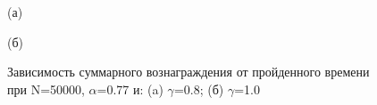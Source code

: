 \documentclass[a4paper]{report}
\theoremstyle{definition}
\theoremstyle{plain}
\theoremstyle{remark}
\theoremstyle{remark}
\theoremstyle{definition}
\begin{document}
\begin{figure}[H]
    \begin{minipage}[H]{0.49\linewidth}
        (а)\\
    \end{minipage}
    \hfill
    \begin{minipage}[H]{0.49\linewidth}
        (б)\\
    \end{minipage}
     \caption{Зависимость суммарного вознаграждения от пройденного времени при N=50000, $\alpha$=0.77 и: (a) $\gamma$=0.8; (б) $\gamma$=1.0}
\end{figure}
\end{document}
